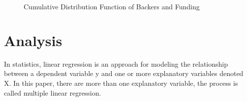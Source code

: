 \begin{figure}[!ht]
\centering
{}
\caption{Cumulative Distribution Function of Backers and Funding}
\label{fig:CDF-overall} %
\end{figure}

\section{Analysis}


In statistics, linear regression is an approach for modeling the relationship between a dependent variable y and one or more explanatory variables denoted X. In this paper, there are more than one explanatory variable, the process is called multiple linear regression.

